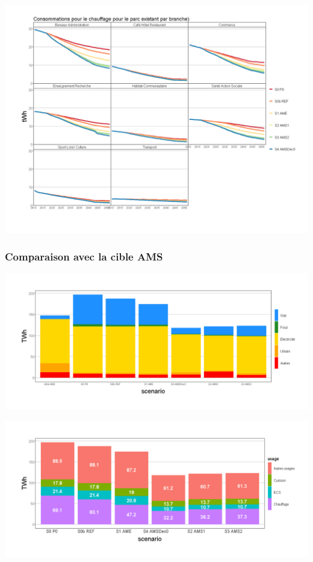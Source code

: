 \documentclass[]{article}
\begin{document}
\includegraphics{Exemple_sortiestertiaire_files/figure-latex/Evol_conso_branche-1.png}

\subsubsection{Comparaison avec la cible
AMS}\label{comparaison-avec-la-cible-ams}

\includegraphics{Exemple_sortiestertiaire_files/figure-latex/comp_cible_AMS_energie-1.png}

\includegraphics{Exemple_sortiestertiaire_files/figure-latex/comp_cible_AMS_usage-1.png}
\end{document}
